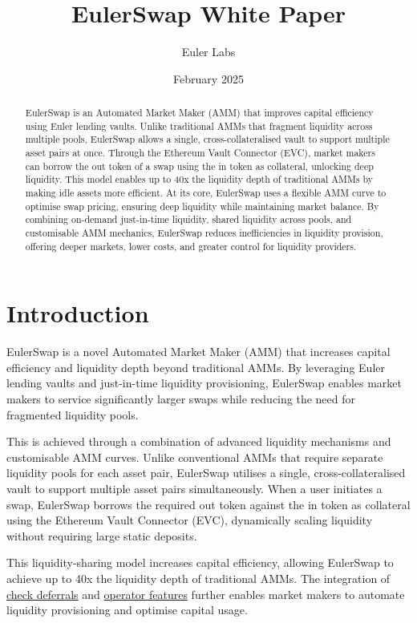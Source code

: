 \documentclass{article}
\title{EulerSwap White Paper}
\author{Euler Labs}
\date{February 2025}
\begin{document}
\maketitle

\begin{abstract}    
EulerSwap is an Automated Market Maker (AMM) that improves capital efficiency using Euler lending vaults. Unlike traditional AMMs that fragment liquidity across multiple pools, EulerSwap allows a single, cross-collateralised vault to support multiple asset pairs at once. Through the Ethereum Vault Connector (EVC), market makers can borrow the out token of a swap using the in token as collateral, unlocking deep liquidity. This model enables up to 40x the liquidity depth of traditional AMMs by making idle assets more efficient. At its core, EulerSwap uses a flexible AMM curve to optimise swap pricing, ensuring deep liquidity while maintaining market balance. By combining on-demand just-in-time liquidity, shared liquidity across pools, and customisable AMM mechanics, EulerSwap reduces inefficiencies in liquidity provision, offering deeper markets, lower costs, and greater control for liquidity providers.
\end{abstract}

\section{Introduction}

EulerSwap is a novel Automated Market Maker (AMM) that increases capital efficiency and liquidity depth beyond traditional AMMs. By leveraging Euler lending vaults and just-in-time liquidity provisioning, EulerSwap enables market makers to service significantly larger swaps while reducing the need for fragmented liquidity pools.

This is achieved through a combination of advanced liquidity mechanisms and customisable AMM curves. Unlike conventional AMMs that require separate liquidity pools for each asset pair, EulerSwap utilises a single, cross-collateralised vault to support multiple asset pairs simultaneously. When a user initiates a swap, EulerSwap borrows the required out token against the in token as collateral using the Ethereum Vault Connector (EVC), dynamically scaling liquidity without requiring large static deposits.

This liquidity-sharing model increases capital efficiency, allowing EulerSwap to achieve up to 40x the liquidity depth of traditional AMMs. The integration of \href{https://docs.euler.finance/developers/evc/keyConcepts?_highlight=operator#batch-operations}{check deferrals} and \href{https://docs.euler.finance/developers/evc/keyConcepts?_highlight=operator#operators}{operator features} further enables market makers to automate liquidity provisioning and optimise capital usage.
\end{document}
